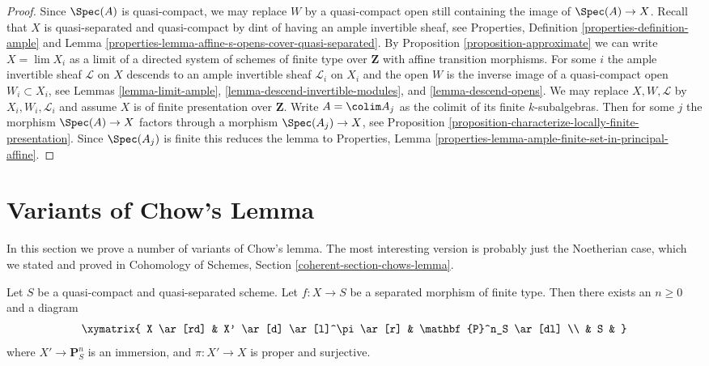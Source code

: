 \begin{proof}
Since $\Spec(A)$ is quasi-compact, we may replace $W$ by a quasi-compact
open still containing the image of $\Spec(A) \to X$.
Recall that $X$ is quasi-separated and quasi-compact by dint
of having an ample invertible sheaf, see
Properties, Definition \ref{properties-definition-ample} and
Lemma \ref{properties-lemma-affine-s-opens-cover-quasi-separated}.
By Proposition \ref{proposition-approximate} we can
write $X = \lim X_i$ as a limit of a directed system
of schemes of finite type over $\mathbf{Z}$
with affine transition morphisms.
For some $i$ the ample invertible sheaf $\mathcal{L}$ on $X$
descends to an ample invertible sheaf $\mathcal{L}_i$ on $X_i$
and the open $W$ is the inverse image of a quasi-compact
open $W_i \subset X_i$, see
Lemmas \ref{lemma-limit-ample}, \ref{lemma-descend-invertible-modules}, and
\ref{lemma-descend-opens}.
We may replace $X, W, \mathcal{L}$ by $X_i, W_i, \mathcal{L}_i$
and assume $X$ is of finite presentation over $\mathbf{Z}$.
Write $A = \colim A_j$ as the colimit of its finite $k$-subalgebras.
Then for some $j$ the morphism $\Spec(A) \to X$ factors through
a morphism $\Spec(A_j) \to X$, see
Proposition \ref{proposition-characterize-locally-finite-presentation}.
Since $\Spec(A_j)$ is finite this reduces the lemma to
Properties, Lemma \ref{properties-lemma-ample-finite-set-in-principal-affine}.
\end{proof}



















\section{Variants of Chow's Lemma}
\label{section-chows-lemma}

\noindent
In this section we prove a number of variants of Chow's lemma.
The most interesting version is probably just the Noetherian
case, which we stated and proved in
Cohomology of Schemes, Section \ref{coherent-section-chows-lemma}.

\begin{lemma}
\label{lemma-chow-finite-type}
Let $S$ be a quasi-compact and quasi-separated scheme.
Let $f : X \to S$ be a separated morphism of finite type.
Then there exists an $n \geq 0$ and a diagram
$$
\xymatrix{
X \ar[rd] & X' \ar[d] \ar[l]^\pi \ar[r] & \mathbf{P}^n_S \ar[dl] \\
& S &
}
$$
where $X' \to \mathbf{P}^n_S$ is an immersion, and
$\pi : X' \to X$ is proper and surjective.
\end{lemma}

